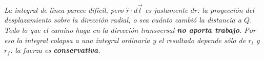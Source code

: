 \begin{center}
\\[0.5em]
{\small\itshape La integral de línea parece difícil, pero $\hat r \cdot d\vec l$
es justamente $dr$: la proyección del desplazamiento sobre la dirección radial,
o sea cuánto cambió la distancia a $Q$. Todo lo que el camino haga en la
dirección transversal \textbf{no aporta trabajo}. Por eso la integral colapsa a
una integral ordinaria y el resultado depende sólo de $r_i$ y $r_f$: la fuerza
es \textbf{conservativa}.}
\end{center}
